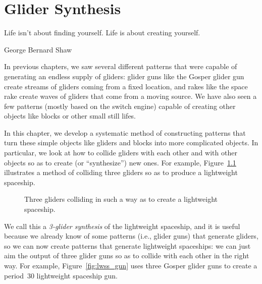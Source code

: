
\renewcommand{\chapterfolder}{glider_synthesis/}
\chapter{Glider Synthesis}\label{chp:glider_synthesis}


\vspace*{-0.4in}
\epigraph{Life isn't about finding yourself. Life is about creating yourself.}{George Bernard Shaw}
\vspace*{0.4in}


\noindent In previous chapters, we saw several different patterns that were capable of generating an endless supply of gliders: glider guns like the Gosper glider gun create streams of gliders coming from a fixed location, and rakes like the space rake create waves of gliders that come from a moving source. We have also seen a few patterns (mostly based on the switch engine) capable of creating other objects like blocks or other small still lifes.

In this chapter, we develop a systematic method of constructing patterns that turn these simple objects like gliders and blocks into more complicated objects. In particular, we look at how to collide gliders with each other and with other objects so as to create (or ``synthesize'') new ones. For example, Figure~\ref{fig:lwss_3_gliders} illustrates a method of colliding three gliders so as to produce a lightweight spaceship.

\begin{figure}[!htb]
	\centering{}
	\caption{Three gliders colliding in such a way as to create a lightweight spaceship.}\label{fig:lwss_3_gliders}
\end{figure}

We call this a \emph{3-glider synthesis} of the lightweight spaceship, and it is useful because we already know of some patterns (i.e., glider guns) that generate gliders, so we can now create patterns that generate lightweight spaceships: we can just aim the output of three glider guns so as to collide with each other in the right way. For example, Figure~\ref{fig:lwss_gun} uses three Gosper glider guns to create a period~30 lightweight spaceship gun.

